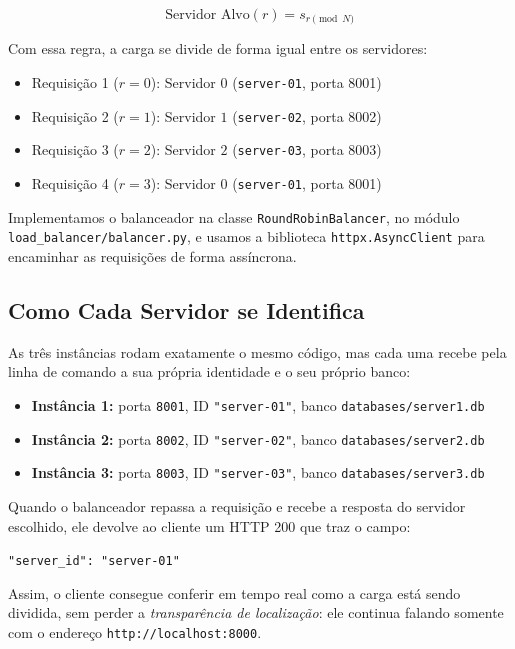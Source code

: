 \documentclass[12pt,a4paper]{article}
\begin{document}
	\begin{equation}
		\text{Servidor Alvo}(r) = s_{r \pmod N}
	\end{equation}
	
	Com essa regra, a carga se divide de forma igual entre os servidores:
	\begin{itemize}
		\item Requisição 1 ($r=0$): Servidor $0$ (\texttt{server-01}, porta 8001)
		\item Requisição 2 ($r=1$): Servidor $1$ (\texttt{server-02}, porta 8002)
		\item Requisição 3 ($r=2$): Servidor $2$ (\texttt{server-03}, porta 8003)
		\item Requisição 4 ($r=3$): Servidor $0$ (\texttt{server-01}, porta 8001)
	\end{itemize}
	
	Implementamos o balanceador na classe \texttt{RoundRobinBalancer}, no módulo \texttt{load\_balancer/balancer.py}, e usamos a biblioteca \texttt{httpx.AsyncClient} para encaminhar as requisições de forma assíncrona.
	
	\subsection{Como Cada Servidor se Identifica}
	As três instâncias rodam exatamente o mesmo código, mas cada uma recebe pela linha de comando a sua própria identidade e o seu próprio banco:
	\begin{itemize}
		\item \textbf{Instância 1:} porta \texttt{8001}, ID \texttt{"server-01"}, banco \texttt{databases/server1.db}
		\item \textbf{Instância 2:} porta \texttt{8002}, ID \texttt{"server-02"}, banco \texttt{databases/server2.db}
		\item \textbf{Instância 3:} porta \texttt{8003}, ID \texttt{"server-03"}, banco \texttt{databases/server3.db}
	\end{itemize}
	
	Quando o balanceador repassa a requisição e recebe a resposta do servidor escolhido, ele devolve ao cliente um HTTP 200 que traz o campo:
	\begin{center}
		\texttt{"server\_id": "server-01"}
	\end{center}
	Assim, o cliente consegue conferir em tempo real como a carga está sendo dividida, sem perder a \textit{transparência de localização}: ele continua falando somente com o endereço \texttt{http://localhost:8000}.
	
\end{document}
